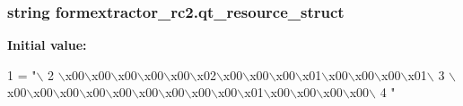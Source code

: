 \subsubsection[{qt\+\_\+resource\+\_\+struct}]{\setlength{\rightskip}{0pt plus 5cm}string formextractor\+\_\+rc2.\+qt\+\_\+resource\+\_\+struct}\label{namespaceformextractor__rc2_a94734ab5cd992eed4dd8bcfc3febe114}
{\bfseries Initial value\+:}
\begin{DoxyCode}
1 = \textcolor{stringliteral}{"\(\backslash\)}
2 \textcolor{stringliteral}{\(\backslash\)x00\(\backslash\)x00\(\backslash\)x00\(\backslash\)x00\(\backslash\)x00\(\backslash\)x02\(\backslash\)x00\(\backslash\)x00\(\backslash\)x00\(\backslash\)x01\(\backslash\)x00\(\backslash\)x00\(\backslash\)x00\(\backslash\)x01\(\backslash\)}
3 \textcolor{stringliteral}{\(\backslash\)x00\(\backslash\)x00\(\backslash\)x00\(\backslash\)x00\(\backslash\)x00\(\backslash\)x00\(\backslash\)x00\(\backslash\)x00\(\backslash\)x00\(\backslash\)x01\(\backslash\)x00\(\backslash\)x00\(\backslash\)x00\(\backslash\)x00\(\backslash\)}
4 \textcolor{stringliteral}{"}
\end{DoxyCode}
